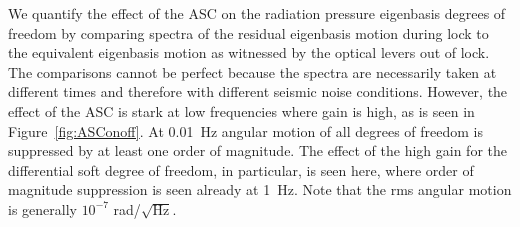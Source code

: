 
We quantify the effect of the ASC on the radiation pressure eigenbasis
degrees of freedom by comparing spectra of the residual eigenbasis
motion during lock to the equivalent eigenbasis motion as witnessed by
the optical levers out of lock. The comparisons cannot be perfect
because the spectra are necessarily taken at different times and
therefore with different seismic noise conditions. However, the effect
of the ASC is stark at low frequencies where gain is high, as is seen
in Figure~\ref{fig:ASConoff}. At 0.01~Hz angular motion of all degrees
of freedom is suppressed by at least one order of magnitude. The
effect of the high gain for the differential soft degree of freedom,
in particular, is seen here, where order of magnitude suppression is
seen already at 1~Hz. Note that the rms angular motion is generally
$10^{-7}$ rad/$\sqrt{\mathrm{Hz}}$.


